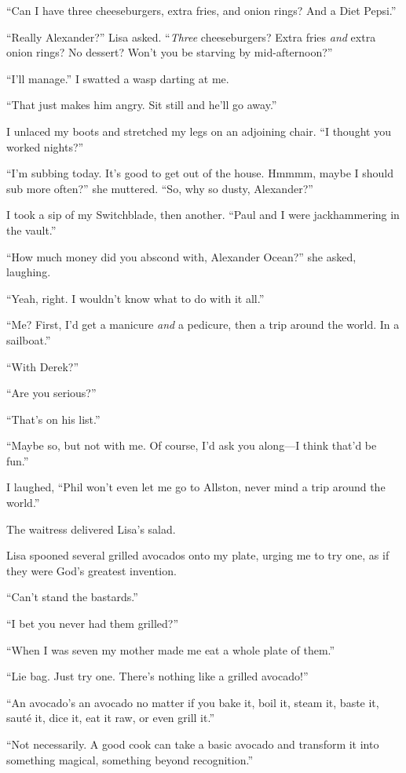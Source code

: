 ``Can I have three cheeseburgers, extra fries, and onion rings? And a
Diet Pepsi.''

``Really Alexander?'' Lisa asked. ``\emph{Three} cheeseburgers? Extra
fries \emph{and} extra onion rings? No dessert? Won't you be starving by
mid-afternoon?''

``I'll manage.'' I swatted a wasp darting at me.

``That just makes him angry. Sit still and he'll go away.''

I unlaced my boots and stretched my legs on an adjoining chair. ``I
thought you worked nights?''

``I'm subbing today. It's good to get out of the house. Hmmmm, maybe I
should sub more often?'' she muttered. ``So, why so dusty, Alexander?''

I took a sip of my Switchblade, then another. ``Paul and I were
jackhammering in the vault.''

``How much money did you abscond with, Alexander Ocean?'' she asked,
laughing.

``Yeah, right. I wouldn't know what to do with it all.''

``Me? First, I'd get a manicure \emph{and} a pedicure, then a trip
around the world. In a sailboat.''

``With Derek?''

``Are you serious?''

``That's on his list.''

``Maybe so, but not with me. Of course, I'd ask you along---I think
that'd be fun.''

I laughed, ``Phil won't even let me go to Allston, never mind a trip
around the world.''

The waitress delivered Lisa's salad.

Lisa spooned several grilled avocados onto my plate, urging me to try
one, as if they were God's greatest invention.

``Can't stand the bastards.''

``I bet you never had them grilled?''

``When I was seven my mother made me eat a whole plate of them.''

``Lie bag. Just try one. There's nothing like a grilled avocado!''

``An avocado's an avocado no matter if you bake it, boil it, steam it,
baste it, sauté it, dice it, eat it raw, or even grill it.''

``Not necessarily. A good cook can take a basic avocado and transform it
into something magical, something beyond recognition.''

